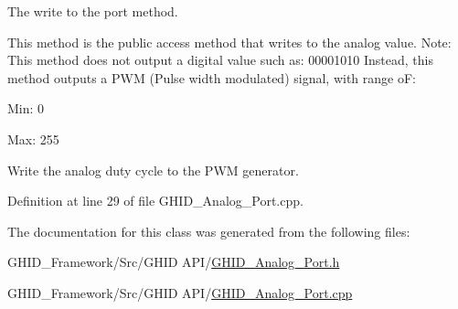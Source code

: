 \-The write to the port method. 

\-This method is the public access method that writes to the analog value. \-Note\-: \-This method does not output a digital value such as\-: 00001010 \-Instead, this method outputs a \-P\-W\-M (\-Pulse width modulated) signal, with range o\-F\-:
\begin{DoxyItemize}
\item \-Min\-: 0
\item \-Max\-: 255 
\end{DoxyItemize}\-Write the analog duty cycle to the \-P\-W\-M generator. 

\-Definition at line 29 of file \-G\-H\-I\-D\-\_\-\-Analog\-\_\-\-Port.\-cpp.



\-The documentation for this class was generated from the following files\-:\begin{DoxyCompactItemize}
\item 
\-G\-H\-I\-D\-\_\-\-Framework/\-Src/\-G\-H\-I\-D A\-P\-I/\hyperlink{_g_h_i_d___analog___port_8h}{\-G\-H\-I\-D\-\_\-\-Analog\-\_\-\-Port.\-h}\item 
\-G\-H\-I\-D\-\_\-\-Framework/\-Src/\-G\-H\-I\-D A\-P\-I/\hyperlink{_g_h_i_d___analog___port_8cpp}{\-G\-H\-I\-D\-\_\-\-Analog\-\_\-\-Port.\-cpp}\end{DoxyCompactItemize}
